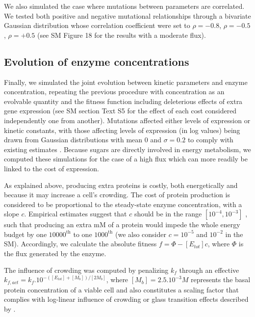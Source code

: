 \documentclass[11pt,onecolumn]{article}
\providecommand{\DIFadd}[1]{{\protect\color{blue} \sf #1}} %
\providecommand{\DIFaddbegin}{} %
\begin{document}
\DIFaddbegin \DIFadd{We also simulated the case where mutations between parameters are correlated. We tested both positive and negative mutational relationships through a bivariate Gaussian distribution whose correlation coefficient were set to $\rho=-0.8$, $\rho=-0.5$, $\rho=+0.5$ (see SM Figure 18 for the results with a moderate flux). 
}

\subsection{\DIFadd{Evolution of enzyme concentrations}}

\DIFadd{Finally, we simulated the joint evolution between kinetic parameters and enzyme concentration, repeating the previous procedure with concentration as an evolvable quantity and the fitness function including deleterious effects of extra gene expression (see SM section Text S5 for the effect of each cost considered independently one from another). Mutations affected either levels of expression or kinetic constants, with those affecting levels of expression (in log values) being drawn from Gaussian distributions with mean $0$ and $\sigma=0.2$ to comply with existing estimates \citep{Landry07,Metzger16,Hodgins-Davis19}. Because sugars are directly involved in energy metabolism, we computed these simulations for the case of a high flux which can more readily be linked to the cost of expression.
}

\DIFadd{As explained above, producing extra proteins is costly, both energetically and because it may increase a cell's crowding. The cost of protein production is considered to be proportional to the steady-state enzyme concentration, with a slope $c$. Empirical estimates suggest that $c$ should be in the range $[10^{-4}, 10^{-3}]$ \citep{Wagner05,Lynch15}, such that producing an extra mM of a protein would impede the whole energy budget by one $10000^\text{th}$ to one $1000^\text{th}$ (we also consider $c=10^{-5}$ and $10^{-2}$ in the SM). Accordingly, we calculate the absolute fitness $f=\Phi-[E_{tot}]c$, where $\Phi$ is the flux generated by the enzyme. 
}

\DIFadd{The influence of crowding was computed by penalizing $k_f$ through an effective $k_{f,act}=k_f.10^{-([E_{tot}]+[M_b])/[2M_b]}$, where $[M_b]=2.5.10^{-3}M$ represents the basal protein concentration of a viable cell and also constitutes a scaling factor that complies with \citet{Andrews20} log-linear influence of crowding or glass transition effects described by \citep{Dill11}.
}
\end{document}
